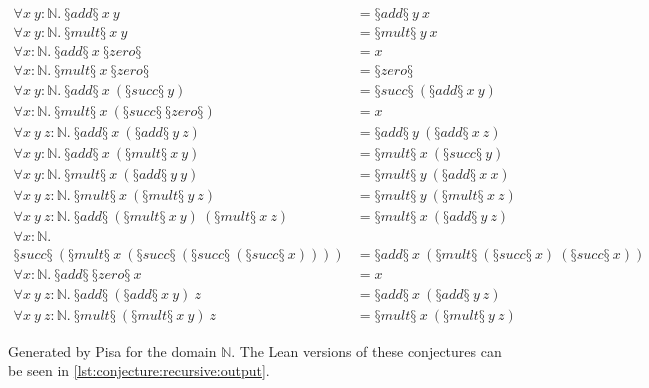 \begin{conjectureset}[H]
\begin{align}
\forall x\ y: \mathbb{N}.\ §add§\ x\ y &= §add§\ y\ x \label{addcom}\\
\forall x\ y: \mathbb{N}.\ §mult§\ x\ y &= §mult§\ y\ x \label{multcom}\\
\forall x: \mathbb{N}.\ §add§\ x\ §zero§ &= x \label{addxzero}\\
\forall x: \mathbb{N}.\ §mult§\ x\ §zero§ &= §zero§ \label{multzero}\\
\forall x\ y: \mathbb{N}.\ §add§\ x\ (§succ§\ y) &= §succ§\ (§add§\ x\ y)\\
\forall x: \mathbb{N}.\ §mult§\ x\ (§succ§\ §zero§) &= x \label{multone}\\
\forall x\ y\ z: \mathbb{N}.\ §add§\ x\ (§add§\ y\ z) &= §add§\ y\ (§add§\ x\ z)\\
\forall x\ y: \mathbb{N}.\ §add§\ x\ (§mult§\ x\ y) &= §mult§\ x\ (§succ§\ y)\\
\forall x\ y: \mathbb{N}.\ §mult§\ x\ (§add§\ y\ y) &= §mult§\ y\ (§add§\ x\ x)\\
\forall x\ y\ z: \mathbb{N}.\ §mult§\ x\ (§mult§\ y\ z) &= §mult§\ y\ (§mult§\ x\ z)\\
\forall x\ y\ z: \mathbb{N}.\ §add§\ (§mult§\ x\ y)\ (§mult§\ x\ z) &= §mult§\ x\ (§add§\ y\ z)\\
\forall x: \mathbb{N}.\ \nonumber \\
  §succ§\ (§mult§\ x\ (§succ§\ (§succ§\ (§succ§\ x)))) &= §add§\ x\ (§mult§\ (§succ§\ x)\ (§succ§\ x))\\
\forall x: \mathbb{N}.\ §add§\ §zero§\ x &= x \label{addzerox}\\
\forall x\ y\ z: \mathbb{N}.\ §add§\ (§add§\ x\ y)\ z &= §add§\ x\ (§add§\ y\ z) \label{addassoc}\\
\forall x\ y\ z: \mathbb{N}.\ §mult§\ (§mult§\ x\ y)\ z &= §mult§\ x\ (§mult§\ y\ z) \label{multassoc}
\end{align}
\vspace{-0.9cm}
\caption[Generated by Pisa for the domain $\mathbb{N}$.]{
  Generated by Pisa for the domain $\mathbb{N}$.
  The Lean versions of these conjectures can be seen in \cref{lst:conjecture:recursive:output}.
}\label{eqs:recursive}
\end{conjectureset}

